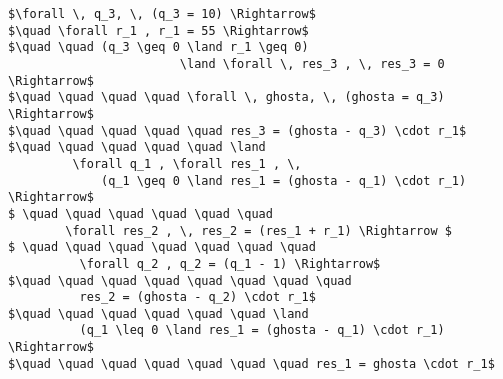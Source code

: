 \begin{lstlisting}[mathescape=true]
$\forall \, q_3, \, (q_3 = 10) \Rightarrow$
$\quad \forall r_1 , r_1 = 55 \Rightarrow$
$\quad \quad (q_3 \geq 0 \land r_1 \geq 0)
						\land \forall \, res_3 , \, res_3 = 0 \Rightarrow$
$\quad \quad \quad \quad \forall \, ghosta, \, (ghosta = q_3) \Rightarrow$
$\quad \quad \quad \quad \quad res_3 = (ghosta - q_3) \cdot r_1$
$\quad \quad \quad \quad \quad \land
         \forall q_1 , \forall res_1 , \,
             (q_1 \geq 0 \land res_1 = (ghosta - q_1) \cdot r_1) \Rightarrow$
$ \quad \quad \quad \quad \quad \quad
        \forall res_2 , \, res_2 = (res_1 + r_1) \Rightarrow $
$ \quad \quad \quad \quad \quad \quad \quad
          \forall q_2 , q_2 = (q_1 - 1) \Rightarrow$
$\quad \quad \quad \quad \quad \quad \quad \quad
          res_2 = (ghosta - q_2) \cdot r_1$
$\quad \quad \quad \quad \quad \quad \land
          (q_1 \leq 0 \land res_1 = (ghosta - q_1) \cdot r_1) \Rightarrow$
$\quad \quad \quad \quad \quad \quad \quad res_1 = ghosta \cdot r_1$
\end{lstlisting}
